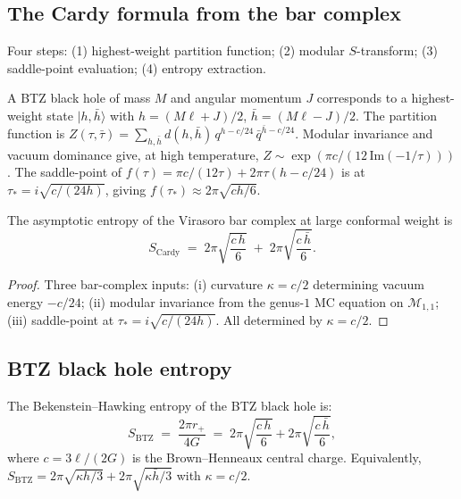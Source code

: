 \documentclass[11pt]{article}
\newcommand{\cM}{\mathcal{M}}
\begin{document}
\subsection{The Cardy formula from the bar complex}
\label{subsec:btz-cardy-derivation}

Four steps: (1) highest-weight partition function; (2) modular
$S$-transform; (3) saddle-point evaluation; (4) entropy extraction.

A BTZ black hole of mass $M$ and angular momentum $J$ corresponds
to a highest-weight state $|h,\bar h\rangle$ with
$h = (M\ell + J)/2$, $\bar h = (M\ell - J)/2$.
The partition function is
$Z(\tau,\bar\tau) = \sum_{h,\bar h} d(h,\bar h)\,
q^{h - c/24}\,\bar q^{\bar h - c/24}$.
Modular invariance and vacuum dominance give, at high temperature,
$Z \sim \exp(\pi c/(12\,\mathrm{Im}(-1/\tau)))$.
The saddle-point of $f(\tau) = \pi c/(12\tau) + 2\pi\tau(h-c/24)$
is at $\tau_* = i\sqrt{c/(24h)}$, giving
$f(\tau_*) \approx 2\pi\sqrt{ch/6}$.

\begin{theorem}
\label{thm:btz-cardy-wn}
The asymptotic entropy of the Virasoro bar complex at large
conformal weight is
\begin{equation}\label{eq:btz-cardy-wn}
\boxed{
S_{\mathrm{Cardy}}
\;=\;
2\pi\sqrt{\frac{c\,h}{6}}
\;+\;
2\pi\sqrt{\frac{c\,\bar h}{6}}.
}
\end{equation}
\end{theorem}

\begin{proof}
Three bar-complex inputs: (i) curvature $\kappa = c/2$
determining vacuum energy $-c/24$; (ii) modular invariance
from the genus-$1$ MC equation on $\cM_{1,1}$; (iii)
saddle-point at $\tau_* = i\sqrt{c/(24h)}$.  All determined
by $\kappa = c/2$.
\end{proof}

\subsection{BTZ black hole entropy}
\label{subsec:btz-entropy-identification}

\begin{theorem}
\label{thm:btz-entropy-wn}
The Bekenstein--Hawking entropy of the BTZ black hole is:
\begin{equation}\label{eq:btz-entropy-final-wn}
\boxed{
S_{\mathrm{BTZ}}
\;=\;
\frac{2\pi r_+}{4G}
\;=\;
2\pi\sqrt{\frac{c\,h}{6}}
+
2\pi\sqrt{\frac{c\,\bar h}{6}},
}
\end{equation}
where $c = 3\ell/(2G)$ is the Brown--Henneaux central charge.
Equivalently, $S_{\mathrm{BTZ}} = 2\pi\sqrt{\kappa h/3}
+ 2\pi\sqrt{\kappa\bar h/3}$ with $\kappa = c/2$.
\end{theorem}
\end{document}
